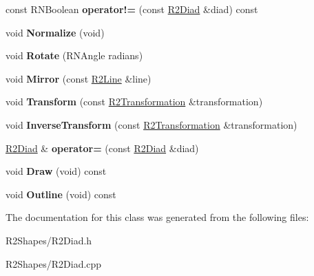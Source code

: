 \begin{DoxyCompactItemize}
\item 
const R\+N\+Boolean {\bfseries operator!=} (const \hyperlink{class_r2_diad}{R2\+Diad} \&diad) const \hypertarget{class_r2_diad_a3820465b0424d7d66946667a7efdcd4d}{}\label{class_r2_diad_a3820465b0424d7d66946667a7efdcd4d}

\item 
void {\bfseries Normalize} (void)\hypertarget{class_r2_diad_a31fbd5298c4f786987f30cdf19b6f0ac}{}\label{class_r2_diad_a31fbd5298c4f786987f30cdf19b6f0ac}

\item 
void {\bfseries Rotate} (R\+N\+Angle radians)\hypertarget{class_r2_diad_a92ff1c2b210ae3288458be8509f3f0a9}{}\label{class_r2_diad_a92ff1c2b210ae3288458be8509f3f0a9}

\item 
void {\bfseries Mirror} (const \hyperlink{class_r2_line}{R2\+Line} \&line)\hypertarget{class_r2_diad_a9046b59c31f647bbc7a4f0015e0baee4}{}\label{class_r2_diad_a9046b59c31f647bbc7a4f0015e0baee4}

\item 
void {\bfseries Transform} (const \hyperlink{class_r2_transformation}{R2\+Transformation} \&transformation)\hypertarget{class_r2_diad_acbf21f28c4e64f7ddcc16f0dae9b36f7}{}\label{class_r2_diad_acbf21f28c4e64f7ddcc16f0dae9b36f7}

\item 
void {\bfseries Inverse\+Transform} (const \hyperlink{class_r2_transformation}{R2\+Transformation} \&transformation)\hypertarget{class_r2_diad_a080ff5f58e3dd9de0ad014fb07821729}{}\label{class_r2_diad_a080ff5f58e3dd9de0ad014fb07821729}

\item 
\hyperlink{class_r2_diad}{R2\+Diad} \& {\bfseries operator=} (const \hyperlink{class_r2_diad}{R2\+Diad} \&diad)\hypertarget{class_r2_diad_adc02ba0856a84870446a3507eae924e6}{}\label{class_r2_diad_adc02ba0856a84870446a3507eae924e6}

\item 
void {\bfseries Draw} (void) const \hypertarget{class_r2_diad_ac1fc795506cfd603c2d91d15fc28f251}{}\label{class_r2_diad_ac1fc795506cfd603c2d91d15fc28f251}

\item 
void {\bfseries Outline} (void) const \hypertarget{class_r2_diad_a71677d938a51cb6f27757d91f6412e75}{}\label{class_r2_diad_a71677d938a51cb6f27757d91f6412e75}

\end{DoxyCompactItemize}


The documentation for this class was generated from the following files\+:\begin{DoxyCompactItemize}
\item 
R2\+Shapes/R2\+Diad.\+h\item 
R2\+Shapes/R2\+Diad.\+cpp\end{DoxyCompactItemize}
